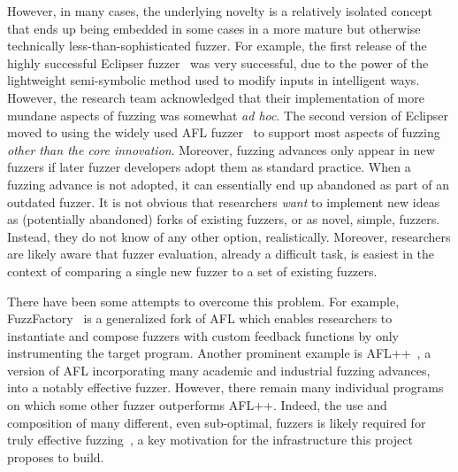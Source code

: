However, in many cases,
the underlying novelty is a relatively isolated concept that ends up being 
embedded in some cases in a more mature but otherwise technically
less-than-sophisticated fuzzer.  For example, 
the first release of the highly successful Eclipser fuzzer~\cite{Eclipser} was very successful, 
due to the power of the lightweight semi-symbolic method used to modify 
inputs in intelligent ways.  However, the research team acknowledged that their 
implementation of more mundane aspects of fuzzing was somewhat \emph{ad hoc}.  The 
second version of Eclipser moved to using the widely used AFL fuzzer~\cite{aflfuzz} to support 
most aspects of fuzzing \emph{other than the core innovation}.  
Moreover, fuzzing advances only appear in new fuzzers 
if later fuzzer developers adopt them as standard practice. When a 
fuzzing advance is not adopted, it can
essentially end up abandoned as part of an outdated fuzzer.   It is
not obvious that researchers \emph{want} to implement new ideas as
(potentially abandoned) forks of existing fuzzers, or as novel,
simple, fuzzers.  Instead, they do not know of any other option,
realistically.  Moreover, researchers are likely aware that fuzzer
evaluation, already a difficult task, is easiest in the context of
comparing a single new fuzzer to a set of existing fuzzers.

There have been some attempts to overcome this problem. For example, 
FuzzFactory~\cite{fuzzfactory} is a generalized fork of AFL which enables researchers 
to instantiate and compose fuzzers with custom feedback functions by only 
instrumenting the target program. Another prominent example is AFL++~\cite{AFLplusplus}, a 
version of AFL incorporating many academic and industrial fuzzing advances, 
into a notably effective fuzzer.  However, there remain many individual 
programs on which some other fuzzer outperforms AFL++. Indeed, the use and
composition of 
many different, even sub-optimal, fuzzers is likely required for truly 
effective fuzzing~\cite{chen2019enfuzz,UsesDiversity,ensemble,pastis}, a key
motivation for the infrastructure this project proposes to build.


